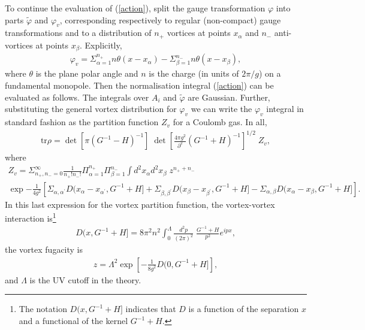 \documentclass[a4paper,a4paper]{article}
\begin{document}
To continue the evaluation of (\ref{action}), split the gauge transformation $\varphi$ into parts $\tilde{\varphi}$ and $\varphi_v$,
corresponding respectively to regular (non-compact) gauge transformations and to a distribution of $n_+$ vortices at points $x_{\alpha}$
and $n_-$ anti-vortices at points $x_{\beta}$. Explicitly,
\begin{gather}
\varphi_v = \Sigma_{\alpha = 1}^{n_{+}} n \theta (x - x_{\alpha}) - \Sigma_{\beta = 1}^{n_{-}} n \theta (x - x_{\beta}),
\end{gather}
where $\theta$ is the plane polar angle and $n$ is the charge (in units of $2\pi/g$) on a fundamental monopole. 
Then the normalisation integral (\ref{action}) can be evaluated as follows.
The integrals over $A_i$ and $\tilde{\varphi}$ are Gaussian. Further, substituting the general vortex distribution for $\varphi_v$
we can write the $\varphi_v$ integral in standard fashion as the partition function $Z_v$ for a Coulomb gas. In all,
\begin{gather}
\mathrm{tr} \rho = \det \left[ \pi (G^{-1} - H)^{-1} \right] \; \det \left[ \frac{4 \pi g^2}{\partial^2} (G^{-1} + H)^{-1} \right]^{1/2}\; Z_v,
\end{gather}
where
\begin{multline}
Z_v = \Sigma_{n_{+} , n_{-} =0}^{\infty} \frac{1}{n_{+} ! n_{-} !} 
\Pi_{\alpha = 1}^{n_{+}} \Pi_{\beta = 1}^{n_{-}}
\int d^2 x_{\alpha} d^2 x_{\beta} \; z^{n_{+} + n_{-}}  \\
 \exp {-\frac{1}{4g^2} \left[ \Sigma_{\alpha, \alpha^{'}}  D(x_{\alpha} - x_{\alpha^{'}}, G^{-1} + H ]  
+ \Sigma_{\beta, \beta^{'}}  D(x_{\beta} - x_{\beta^{'}}, G^{-1} + H ]  
- \Sigma_{\alpha, \beta}   D(x_{\alpha} - x_{\beta}, G^{-1} + H ] \right]}.
\end{multline}
In this last expression for the vortex partition function, the vortex-vortex interaction is\footnote{The notation
$D(x, G^{-1} + H ]$ indicates that $D$ is a function of the separation $x$ and a functional of the kernel $G^{-1} + H$.}
\begin{gather} \label{vorint}
D(x, G^{-1} + H ] = 8 \pi^2 n^2 \int_{0}^{\Lambda} \frac{d^2 p}{(2 \pi)^2} \; \frac{G^{-1} + H}{p^2} e^{ipx},
\end{gather}
the vortex fugacity is
\begin{gather} \label{fug}
z = \Lambda^2 \exp{\left[ - \frac{1}{8 g^2} D (0 , G^{-1} + H] \right] },
\end{gather}
and $\Lambda$ is the UV cutoff in the theory.
\end{document}
